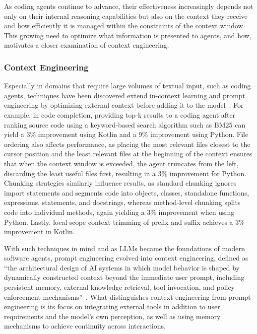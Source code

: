 \documentclass[
english,                 %
bibtex,                  %
includeExtraAbstracts, %
]{kththesis}
\numberwithin{listing}{chapter}
\begin{document}
As coding agents continue to advance, their effectiveness increasingly depends not only on their internal reasoning capabilities but also on the context they receive and how efficiently it is managed within the constraints of the context window. This growing need to optimize what information is presented to agents, and how, motivates a closer examination of context engineering.

\subsubsection{Context Engineering}

Especially in domains that require large volumes of textual input, such as coding agents, techniques have been discovered extend in-context learning and prompt engineering by optimizing external context before adding it to the model~\cite{yusuf_beyond_2025}. For example, in code completion, providing top-k results to a coding agent after ranking source code using a keyword-based search algorithm such as \gls{BM25} can yield a 3\% improvement using Kotlin and a 9\% improvement using Python. File ordering also affects performance, as placing the most relevant files closest to the cursor position and the least relevant files at the beginning of the context ensures that when the context window is exceeded, the agent truncates from the left, discarding the least useful files first, resulting in a 3\% improvement for Python. Chunking strategies similarly influence results, as standard chunking ignores import statements and segments code into objects, classes, standalone functions, expressions, statements, and docstrings, whereas method-level chunking splits code into individual methods, again yielding a 3\% improvement when using Python. Lastly, local scope context trimming of prefix and suffix achieves a 3\% improvement in Kotlin.

With such techniques in mind and as \glspl{LLM} became the foundations of modern software agents, prompt engineering evolved into context engineering, defined as ``the architectural design of AI systems in which model behavior is shaped by dynamically constructed context beyond the immediate user prompt, including persistent memory, external knowledge retrieval, tool invocation, and policy enforcement mechanisms''~\cite{cinar_prompt_2026}. What distinguishes context engineering from prompt engineering is its focus on integrating external tools in addition to user requirements and the model's own perception, as well as using memory mechanisms to achieve continuity across interactions.
\end{document}
